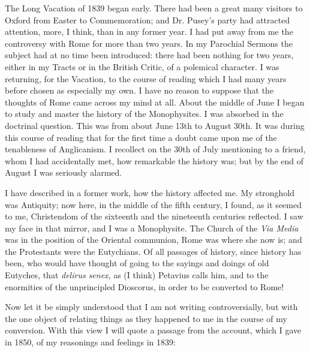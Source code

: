 The Long Vacation of 1839 began early. There had been a great many
visitors to Oxford from Easter to Commemoration; and Dr. Pusey's party had attracted attention, more, I think, than
in
any former year. I had put away from me the controversy with Rome for
more than two years. In my Parochial Sermons the subject had at no time been introduced: there had been nothing for two years, either in my
Tracts or in the British Critic, of a polemical character. I was
returning, for the Vacation, to the course of reading which I had many
years before chosen as especially my own. I have no reason to suppose
that the thoughts of Rome came across my mind at all. About the middle
of June I began to study and master the history of the Monophysites. I
was absorbed in the doctrinal question. This was from about June 13th to
August 30th. It was during this course of reading that for the first
time a doubt came upon me of the tenableness of Anglicanism. I recollect
on the 30th of July mentioning to a friend, whom I had accidentally met,
how remarkable the history was; but by the end of August I was seriously
alarmed.

I have described in a former work, how the history affected me. My
stronghold was Antiquity; now here, in the middle of the fifth century,
I found, as it seemed to me, Christendom of the sixteenth and the
nineteenth centuries reflected. I saw my face in that mirror, and I was
a Monophysite. The Church of the \emph{Via Media} was in the position of
the Oriental communion, Rome was where she now is; and the Protestants
were the Eutychians. Of all passages of history, since history has been,
who would have thought of going to the sayings and doings of old
Eutyches, that \emph{delirus senex}, as (I think) Petavius calls him,
and to the enormities of the unprincipled Dioscorus, in order to be
converted to Rome!

Now let it be simply understood that I am not writing
controversially, but with the one object of relating things as they
happened to me in the course of my conversion. With this view I will
quote a passage from the account, which I gave in 1850, of my reasonings
and feelings in 1839:

